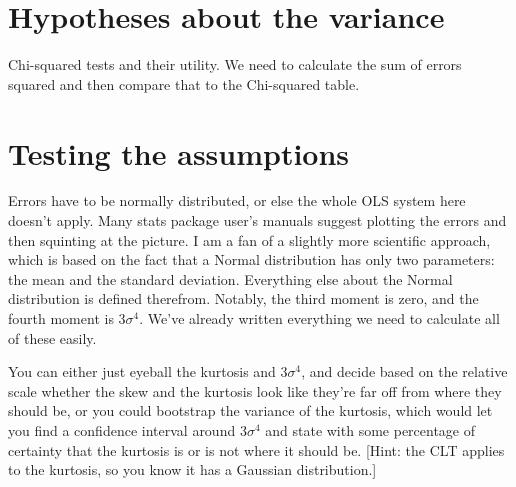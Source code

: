 \section{Hypotheses about the variance}
Chi-squared tests and their utility. We need to calculate the sum of errors squared 
and then compare that to the Chi-squared table. 


\section{Testing the assumptions} Errors have to be normally distributed, or else
the whole OLS system here doesn't apply. Many stats package user's manuals
suggest plotting the errors and then squinting at the picture. I am a
fan of a slightly more scientific approach, which is based on the fact
that a Normal distribution has only two parameters: the mean and the
standard deviation. Everything else about the Normal distribution is
defined therefrom. Notably, the third moment is zero, and the fourth
moment is $3 \sigma^4$. We've already written everything we need to
calculate all of these easily.



You can either just eyeball the kurtosis and $3 \sigma^4$, and decide
based on the relative scale whether the skew and the kurtosis look
like they're far off from where they should be, or you could bootstrap the
variance of the kurtosis, which would let you find a confidence interval
around $3 \sigma^4$ and state with some percentage of certainty that the
kurtosis is or is not where it should be. [Hint: the CLT applies to the
kurtosis, so you know it has a Gaussian distribution.]
